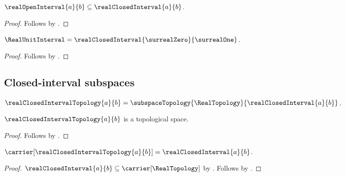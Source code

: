 \begin{proposition}\label{real_open_interval_subset_closed_interval}
    $\realOpenInterval{a}{b}\subseteq\realClosedInterval{a}{b}$.
\end{proposition}
\begin{proof}
    Follows by
        .
\end{proof}

\begin{proposition}\label{real_unit_interval_eq_closed_interval}
    $\RealUnitInterval=
        \realClosedInterval{\surrealZero}{\surrealOne}$.
\end{proposition}
\begin{proof}
    Follows by
        .
\end{proof}

\subsection{Closed-interval subspaces}

\begin{definition}\label{real_closed_interval_topology}
    $\realClosedIntervalTopology{a}{b}=
        \subspaceTopology{\RealTopology}{\realClosedInterval{a}{b}}$.
\end{definition}

\begin{theorem}\label{real_closed_interval_topology_is_topological_space}
    $\realClosedIntervalTopology{a}{b}$ is a topological space.
\end{theorem}
\begin{proof}
    Follows by
        .
\end{proof}

\begin{proposition}\label{real_closed_interval_topology_carrier}
    $\carrier[\realClosedIntervalTopology{a}{b}]=
        \realClosedInterval{a}{b}$.
\end{proposition}
\begin{proof}
    $\realClosedInterval{a}{b}\subseteq\carrier[\RealTopology]$
        by .
    Follows by
        .
\end{proof}

